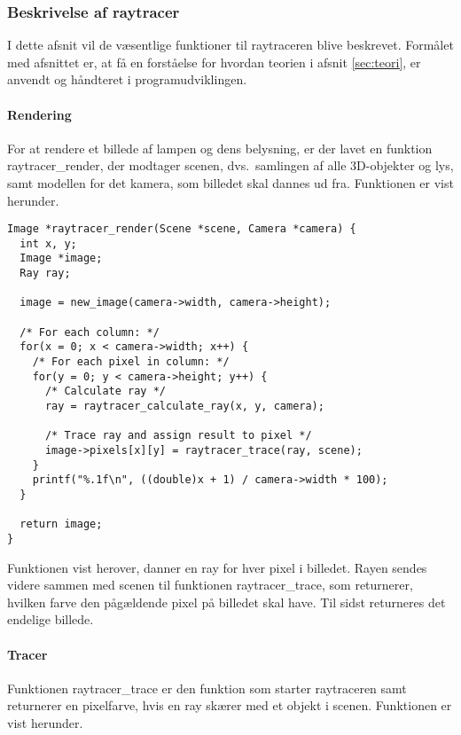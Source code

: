 \subsubsection{Beskrivelse af raytracer}
I dette afsnit vil de væsentlige funktioner til raytraceren blive beskrevet. Formålet med afsnittet er, at få en forståelse for hvordan teorien i afsnit \ref{sec:teori}, er anvendt og håndteret i programudviklingen.


\paragraph{Rendering}
For at rendere et billede af lampen og dens belysning, er der lavet en funktion raytracer\_render, der modtager scenen, dvs.\ samlingen af alle 3D-objekter og lys, samt modellen for det kamera, som billedet skal dannes ud fra. Funktionen er vist herunder.

\begin{lstlisting}[style=Cstyle, caption=Funktionen der rendere billedet af scenen med et kameras perspektiv]
Image *raytracer_render(Scene *scene, Camera *camera) {
  int x, y;
  Image *image;
  Ray ray;

  image = new_image(camera->width, camera->height);
  
  /* For each column: */
  for(x = 0; x < camera->width; x++) {
    /* For each pixel in column: */
    for(y = 0; y < camera->height; y++) {
      /* Calculate ray */
      ray = raytracer_calculate_ray(x, y, camera);
      
      /* Trace ray and assign result to pixel */
      image->pixels[x][y] = raytracer_trace(ray, scene);
    }
    printf("%.1f\n", ((double)x + 1) / camera->width * 100);
  }

  return image;
}
\end{lstlisting}

Funktionen vist herover, danner en ray for hver pixel i billedet. Rayen sendes videre sammen med scenen til funktionen raytracer\_trace, som returnerer, hvilken farve den pågældende pixel på billedet skal have. Til sidst returneres det endelige billede.

\paragraph{Tracer}
Funktionen raytracer\_trace er den funktion som starter raytraceren samt returnerer en pixelfarve, hvis en ray skærer med et objekt i scenen. Funktionen er vist herunder.  

